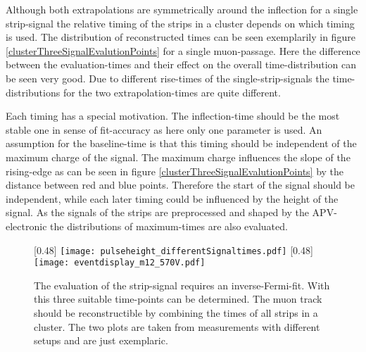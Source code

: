 \documentclass[
twoside,            %
BCOR1.4cm,          %
10pt,               %
headings=normal,    %
headsepline,        %
clearplainpage,		%
final,              %
div=14,
open=right,
bibliography=toc
]{scrreprt}
\begin{document}
Although both extrapolations are symmetrically around the inflection for a single strip-signal the relative timing of the strips in a cluster depends on which timing is used.
The distribution of reconstructed times can be seen exemplarily in figure \ref{clusterThreeSignalEvalutionPoints} for a single muon-passage.
Here the difference between the evaluation-times and their effect on the overall time-distribution can be seen very good.
Due to different rise-times of the single-strip-signals the time-distributions for the two extrapolation-times are quite different.

Each timing has a special motivation.
The inflection-time should be the most stable one in sense of fit-accuracy as here only one parameter is used.
An assumption for the baseline-time is that this timing should be independent of the maximum charge of the signal. 
The maximum charge influences the slope of the rising-edge as can be seen in figure \ref{clusterThreeSignalEvalutionPoints} by the distance between red and blue points.
Therefore the start of the signal should be independent, while each later timing could be influenced by the height of the signal.
As the signals of the strips are preprocessed and shaped by the APV-electronic the distributions of maximum-times are also evaluated.

\begin{figure}[!h]
	\centering
	[0.48\textwidth]
	{\texttt{[image: pulseheight\_differentSignaltimes.pdf]}}
	\hfill
	[0.48\textwidth]
	{\texttt{[image: eventdisplay\_m12\_570V.pdf]}}
	\vspace{-2mm}
	\caption{
		The evaluation of the strip-signal requires an inverse-Fermi-fit.
		With this three suitable time-points can be determined.
		The muon track should be reconstructible by combining the times of all strips in a cluster.
		The two plots are taken from measurements with different setups and are just exemplaric.
	}
\end{figure}
\end{document}
